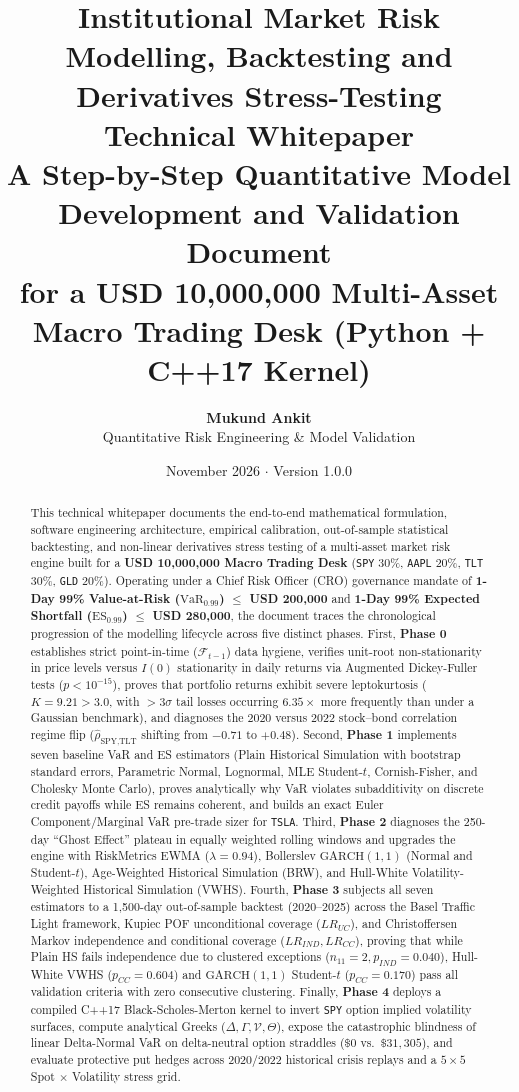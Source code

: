 \documentclass[11pt,a4paper]{article}
\title{
    \vspace{-1.2cm}
    \textbf{\LARGE\color{navy} Institutional Market Risk Modelling, Backtesting and Derivatives Stress-Testing Technical Whitepaper}\\[0.35cm]
    \large A Step-by-Step Quantitative Model Development and Validation Document\\
    for a USD 10,000,000 Multi-Asset Macro Trading Desk (Python + C++17 Kernel)
}
\author{\textbf{Mukund Ankit}\\Quantitative Risk Engineering \& Model Validation}
\date{November 2026 $\cdot$ Version 1.0.0}
\begin{document}
\maketitle
\thispagestyle{empty}

\begin{abstract}
\noindent This technical whitepaper documents the end-to-end mathematical formulation, software engineering architecture, empirical calibration, out-of-sample statistical backtesting, and non-linear derivatives stress testing of a multi-asset market risk engine built for a \textbf{USD 10,000,000 Macro Trading Desk} (\texttt{SPY} 30\%, \texttt{AAPL} 20\%, \texttt{TLT} 30\%, \texttt{GLD} 20\%). Operating under a Chief Risk Officer (CRO) governance mandate of \textbf{1-Day 99\% Value-at-Risk ($\text{VaR}_{0.99}$) $\le$ USD 200,000} and \textbf{1-Day 99\% Expected Shortfall ($\text{ES}_{0.99}$) $\le$ USD 280,000}, the document traces the chronological progression of the modelling lifecycle across five distinct phases. First, \textbf{Phase 0} establishes strict point-in-time ($\mathcal{F}_{t-1}$) data hygiene, verifies unit-root non-stationarity in price levels versus $I(0)$ stationarity in daily returns via Augmented Dickey-Fuller tests ($p < 10^{-15}$), proves that portfolio returns exhibit severe leptokurtosis ($K = 9.21 > 3.0$, with $>3\sigma$ tail losses occurring $6.35\times$ more frequently than under a Gaussian benchmark), and diagnoses the 2020 versus 2022 stock--bond correlation regime flip ($\hat{\rho}_{\text{SPY,TLT}}$ shifting from $-0.71$ to $+0.48$). Second, \textbf{Phase 1} implements seven baseline VaR and ES estimators (Plain Historical Simulation with bootstrap standard errors, Parametric Normal, Lognormal, MLE Student-$t$, Cornish-Fisher, and Cholesky Monte Carlo), proves analytically why VaR violates subadditivity on discrete credit payoffs while ES remains coherent, and builds an exact Euler Component/Marginal VaR pre-trade sizer for \texttt{TSLA}. Third, \textbf{Phase 2} diagnoses the 250-day ``Ghost Effect'' plateau in equally weighted rolling windows and upgrades the engine with RiskMetrics EWMA ($\lambda=0.94$), Bollerslev $\text{GARCH}(1,1)$ (Normal and Student-$t$), Age-Weighted Historical Simulation (BRW), and Hull-White Volatility-Weighted Historical Simulation (VWHS). Fourth, \textbf{Phase 3} subjects all seven estimators to a 1,500-day out-of-sample backtest (2020--2025) across the Basel Traffic Light framework, Kupiec POF unconditional coverage ($LR_{UC}$), and Christoffersen Markov independence and conditional coverage ($LR_{IND}, LR_{CC}$), proving that while Plain HS fails independence due to clustered exceptions ($n_{11}=2, p_{IND}=0.040$), Hull-White VWHS ($p_{CC}=0.604$) and $\text{GARCH}(1,1)$ Student-$t$ ($p_{CC}=0.170$) pass all validation criteria with zero consecutive clustering. Finally, \textbf{Phase 4} deploys a compiled C++17 Black-Scholes-Merton kernel to invert \texttt{SPY} option implied volatility surfaces, compute analytical Greeks ($\Delta, \Gamma, \mathcal{V}, \Theta$), expose the catastrophic blindness of linear Delta-Normal VaR on delta-neutral option straddles ($\$0$ vs.\ $\$31,305$), and evaluate protective put hedges across 2020/2022 historical crisis replays and a $5 \times 5$ Spot $\times$ Volatility stress grid.

\end{abstract}
\end{document}
